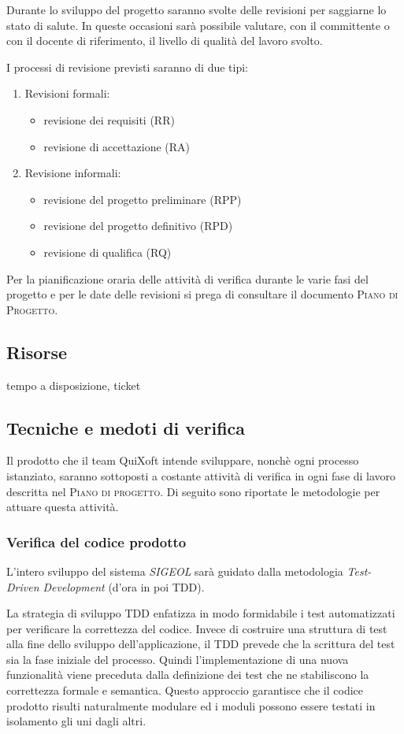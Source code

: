 \documentclass[11pt,a4paper]{article}
\begin{document}
Durante lo sviluppo del progetto saranno svolte delle revisioni per saggiarne lo stato di salute. In queste occasioni sarà possibile valutare, con il committente o con il docente di riferimento, il livello di qualità del lavoro svolto.

I processi di revisione previsti saranno di due tipi:
\begin{enumerate}
 	\item Revisioni formali:
	\begin{itemize}
		\item revisione dei requisiti (RR)
		\item revisione di accettazione (RA)
	\end{itemize}
 	\item Revisione informali:
	\begin{itemize}
		\item revisione del progetto preliminare (RPP)
		\item revisione del progetto definitivo (RPD)
		\item revisione di qualifica (RQ)
	\end{itemize}
\end{enumerate}

Per la pianificazione oraria delle attività di verifica durante le varie fasi del progetto e per le date delle revisioni si prega di consultare il documento \textsc{Piano di Progetto}.
\subsection{Risorse} tempo a disposizione, ticket
\subsection{Tecniche e medoti di verifica}
Il prodotto che il team QuiXoft intende sviluppare, nonchè ogni processo istanziato, saranno sottoposti a costante attività di verifica in ogni fase di lavoro descritta nel \textsc{Piano di progetto}. Di seguito sono riportate le metodologie per attuare questa attività.
\subsubsection{Verifica del codice prodotto}
L'intero sviluppo del sistema \textit{SIGEOL} sarà guidato dalla metodologia \textit{Test-Driven Development} (d'ora in poi TDD).

La strategia di sviluppo TDD enfatizza in modo formidabile i test automatizzati per verificare la correttezza del codice. Invece di costruire una struttura di test alla fine dello sviluppo dell’applicazione, il TDD prevede che la scrittura del test sia la fase iniziale del processo. Quindi l’implementazione di una nuova funzionalità viene preceduta dalla definizione dei test che ne stabiliscono la correttezza formale e semantica. Questo approccio garantisce che il codice prodotto risulti naturalmente modulare ed i moduli possono essere testati in isolamento gli uni dagli altri.
\end{document}
